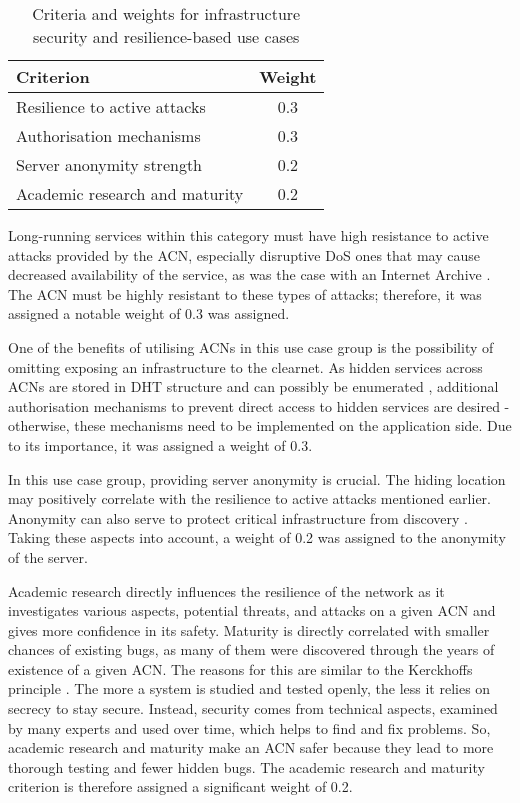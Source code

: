 \begin{table}[!ht]
\centering
\caption{Criteria and weights for infrastructure security and resilience-based use cases}
\begin{tabular}{|l|c|}
\hline
\textbf{Criterion} & \textbf{Weight} \\
\hline
Resilience to active attacks & 0.3 \\
Authorisation mechanisms & 0.3 \\
Server anonymity strength & 0.2 \\
Academic research and maturity & 0.2 \\
\hline
\end{tabular}
\label{tab:infrastructure_security_and_resilience_criteria}
\end{table}

Long-running services within this category must have high resistance to active attacks provided by the ACN, especially disruptive DoS ones that may cause decreased availability of the service, as was the case with an Internet Archive \cite{ddos-web-archive}. The ACN must be highly resistant to these types of attacks; therefore, it was assigned a notable weight of 0.3 was assigned.

One of the benefits of utilising ACNs in this use case group is the possibility of omitting exposing an infrastructure to the clearnet. As hidden services across ACNs are stored in DHT structure and can possibly be enumerated \cite{Owen2016}, additional authorisation mechanisms to prevent direct access to hidden services are desired - otherwise, these mechanisms need to be implemented on the application side. Due to its importance, it was assigned a weight of 0.3.

In this use case group, providing server anonymity is crucial. The hiding location may positively correlate with the resilience to active attacks mentioned earlier. Anonymity can also serve to protect critical infrastructure from discovery \cite{torusers}. Taking these aspects into account, a weight of 0.2 was assigned to the anonymity of the server.

Academic research directly influences the resilience of the network as it investigates various aspects, potential threats, and attacks on a given ACN and gives more confidence in its safety. Maturity is directly correlated with smaller chances of existing bugs, as many of them were discovered through the years of existence of a given ACN. The reasons for this are similar to the Kerckhoffs principle \cite{kerckhoffs}. The more a system is studied and tested openly, the less it relies on secrecy to stay secure. Instead, security comes from technical aspects, examined by many experts and used over time, which helps to find and fix problems. So, academic research and maturity make an ACN safer because they lead to more thorough testing and fewer hidden bugs. The academic research and maturity criterion is therefore assigned a significant weight of 0.2.


